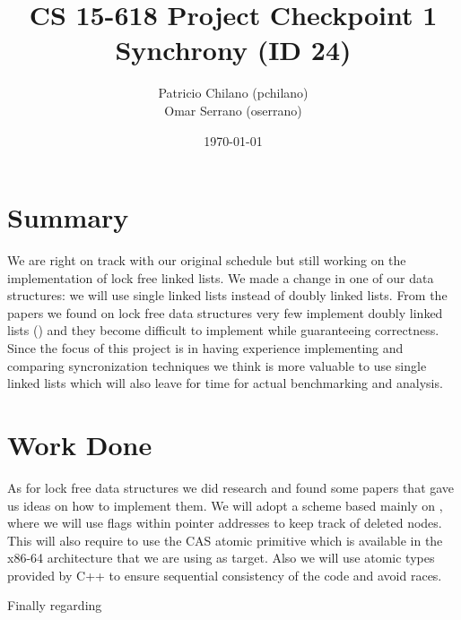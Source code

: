 \documentclass[11pt]{article}
\title{\vspace{-25pt}
\huge CS 15-618 Project Checkpoint 1 \\
\huge Synchrony (ID 24)
}
\author{
    Patricio Chilano (pchilano) \\
    Omar Serrano (oserrano)
}
\date{\today}
\begin{document}


\maketitle

\section*{Summary}
We are right on track with our original schedule but still working on the implementation
of lock free linked lists. We made a change in one of our data structures: we will use single linked
lists instead of doubly linked lists. From the papers we found on lock free data structures very 
few implement doubly linked lists (\cite{Sundell}) and they become difficult to implement
while guaranteeing correctness. Since the focus of this project is in having experience implementing 
and comparing syncronization techniques we think is more valuable to use single linked lists 
which will also leave for time for actual benchmarking and analysis.

\section*{Work Done}

As for lock free data structures we did research and found some papers that gave us ideas on how
to implement them. We will adopt a scheme based mainly on \cite{Harris}, where we will use flags within
pointer addresses to keep track of deleted nodes. This will also require to use the CAS atomic primitive
which is available in the x86-64 architecture that we are using as target. Also we will use atomic types
provided by C++ to ensure sequential consistency of the code and avoid races.

Finally regarding 
\end{document}
